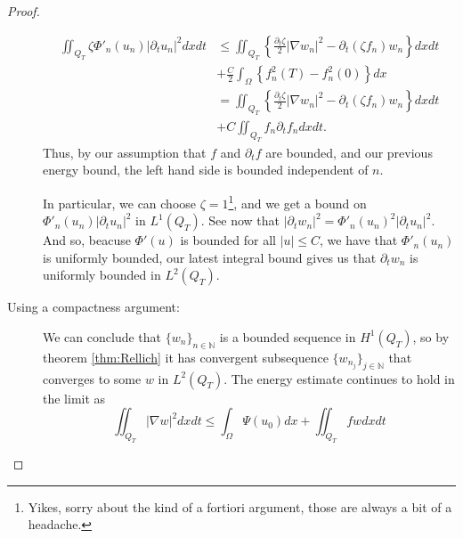 \documentclass[11pt, a4paper]{article}
\begin{document}
\begin{proof}
\begin{description}
\begin{align*}
	\iint_{Q_T} \zeta \Phi'_n(u_n) |\partial_t u_n|^2 dxdt &\leq \iint_{Q_T} \left\{ \frac{\partial_t \zeta}{2}|\nabla w_n|^2 - \partial_t(\zeta f_n) w_n \right\} dxdt \\
	&+ \frac{C}{2}\int_\Omega \left\{ f_n^2(T) - f_n^2(0) \right\} dx	\\
	&= \iint_{Q_T} \left\{ \frac{\partial_t \zeta}{2}|\nabla w_n|^2 - \partial_t(\zeta f_n) w_n \right\} dxdt \\
	&+ C \iint_{Q_T} f_n\partial_t f_n dxdt.
	\end{align*}
	Thus, by our assumption that $f$ and $\partial_t f$ are bounded, and our previous energy bound, the left hand side is bounded independent of $n$.
	
	In particular, we can choose $\zeta = 1$\footnote{Yikes, sorry about the kind of a fortiori argument, those are always a bit of a headache.}, and we get a bound on $\Phi'_n(u_n)|\partial_t u_n|^2$ in $L^1(Q_T)$. See now that $|\partial_t w_n	|^2 = \Phi'_n(u_n)^2|\partial_t u_n|^2$. And so, beacuse $\Phi'(u)$ is bounded for all $|u| \leq C$, we have that $\Phi'_n(u_n)$ is uniformly bounded, our latest integral bound gives us that $\partial_t w_n$ is uniformly bounded in $L^2(Q_T)$.
	
	\item[Using a compactness argument:] We can conclude that $\{w_n\}_{n \in \mathbb{N}}$ is a bounded sequence in $H^1(Q_T)$, so by theorem \ref{thm:Rellich} it has convergent subsequence $\{w_{n_j}\}_{j \in \mathbb{N}}$ that converges to some $w$ in $L^2(Q_T)$. The energy estimate continues to hold in the limit as
	\begin{equation}
	\iint_{Q_T}|\nabla w|^2 dxdt \leq \int_\Omega \Psi(u_0)dx + \iint_{Q_T}fw dxdt
	\end{equation}
	

\end{description}
\end{proof}
\end{document}
